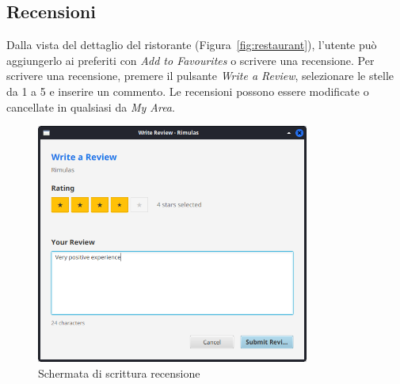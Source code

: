 \subsection{Recensioni}
Dalla vista del dettaglio del ristorante (Figura~\ref{fig:restaurant}), l'utente può
aggiungerlo ai preferiti con \emph{Add to Favourites} o scrivere una recensione.
Per scrivere una recensione, premere il pulsante 
\emph{Write a Review}, selezionare le stelle da 1 a 5 e inserire un commento.
Le recensioni possono essere modificate o cancellate in qualsiasi da \emph{My Area}.
\begin{figure}[H]
    \centering
    \includegraphics[width=0.8\textwidth]{images/review.png}
    \caption{Schermata di scrittura recensione}
    \label{fig:review}
\end{figure}